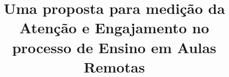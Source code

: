 \title{Uma proposta para medição da Atenção e Engajamento no processo de Ensino em Aulas Remotas}

% 
